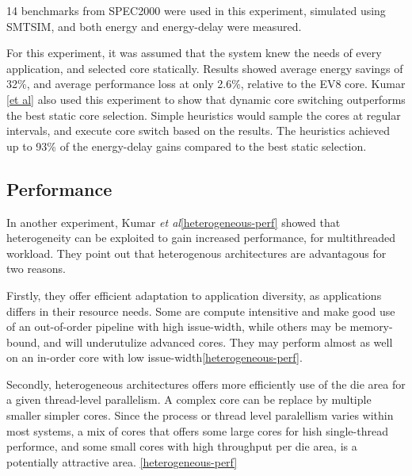14 benchmarks from SPEC2000 were used in this experiment, simulated using SMTSIM, and both energy and energy-delay were measured.

For this experiment, it was assumed that the system knew the needs of every application, and selected core statically. 
Results showed average energy savings of 32\%, and average performance loss at only 2.6\%, relative to the EV8 core.
Kumar \ref{et al} also used this experiment to show that dynamic core switching outperforms the best static core selection.
Simple heuristics would sample the cores at regular intervals, and execute core switch based on the results.
The heuristics achieved up to 93\% of the energy-delay gains compared to the best static selection. 

\subsection{Performance}
In another experiment, Kumar \textit{et al}\ref{heterogeneous-perf} showed that heterogeneity can be exploited to gain increased performance, for multithreaded workload.
They point out that heterogenous architectures are advantagous for two reasons.

Firstly, they offer efficient adaptation to application diversity, as applications differs in their resource needs.
Some are compute intensitive and make good use of an out-of-order pipeline with high issue-width, while others may be memory-bound, and will underutulize advanced cores.
They may perform almost as well on an in-order core with low issue-width\ref{heterogeneous-perf}.

Secondly, heterogeneous architectures offers more efficiently use of the die area for a given thread-level parallelism.
A complex core can be replace by multiple smaller simpler cores. 
Since the process or thread level paralellism varies within most systems, a mix of cores that offers some large cores for hish single-thread performce, and some small cores with high throughput per die area, is a potentially attractive area. \ref{heterogeneous-perf}

